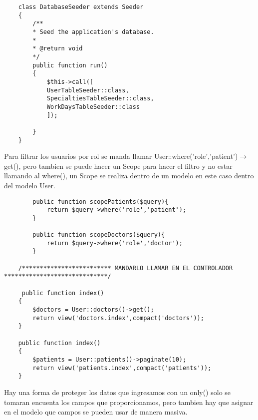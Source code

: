 \documentclass[a4paper]{article}
\begin{document}
	\begin{lstlisting}
	class DatabaseSeeder extends Seeder
	{
		/**
		* Seed the application's database.
		*
		* @return void
		*/
		public function run()
		{
			$this->call([
			UserTableSeeder::class,
			SpecialtiesTableSeeder::class,
			WorkDaysTableSeeder::class
			]);
			
		}
	}
	\end{lstlisting} 
	
		
    Para filtrar los usuarios por rol se manda llamar User::where('role','patient')$\rightarrow$get(), pero tambien se puede hacer un Scope para hacer el filtro y no estar llamando al where(), un Scope se realiza dentro de un modelo en este caso dentro del modelo User.
    
    
    \begin{lstlisting}
    	public function scopePatients($query){
    		return $query->where('role','patient');
    	}
    	
    	public function scopeDoctors($query){
    		return $query->where('role','doctor');
    	}
    
    /************************* MANDARLO LLAMAR EN EL CONTROLADOR *****************************/
    
     public function index()
    {
    	$doctors = User::doctors()->get();
    	return view('doctors.index',compact('doctors'));
    }

	public function index()
	{
		$patients = User::patients()->paginate(10);
		return view('patients.index',compact('patients'));
	}
    \end{lstlisting} 

	
	Hay una forma de proteger los datos que ingresamos con un only() solo se tomaran encuenta los campos que proporcionamos, pero tambien hay que asignar en el modelo que campos se pueden usar de manera masiva.
    
\end{document}
